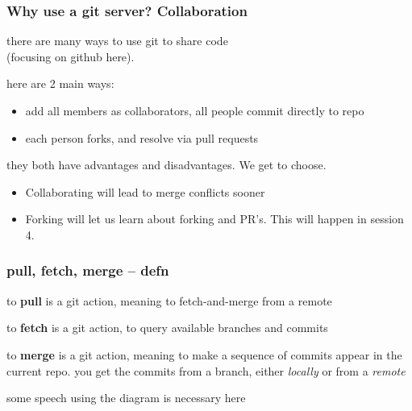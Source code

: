 \documentclass[14pt,aspectratio=1610]{beamer} %
\newcommand{\fframe}[2]{
   \begin{frame}
\frametitle{#1}
#2
\end{frame}
}
\begin{document}
\fframe{Why use a git server? Collaboration}
{

	there are many ways to use git to share code \\(focusing on github here).  


	\vspace{\baselineskip}
	here are 2 main ways:

\vspace{\baselineskip}
	\begin{itemize}
	\item add all members as collaborators, all people commit directly to repo
	\item each person forks, and resolve via pull requests
\end{itemize}

\vspace{\baselineskip}

they both have advantages and disadvantages.  We get to choose.  
	\begin{itemize}
	\item Collaborating will lead to merge conflicts sooner
	\item Forking will let us learn about forking and PR's.  This will happen in session 4.
\end{itemize}
}





\fframe{pull, fetch, merge -- defn}
{
\begin{definition}
to {\bf pull} is a git action, meaning to fetch-and-merge from a remote
	\end{definition}

	\begin{definition}
to {\bf fetch} is a git action, to query available branches and commits
	\end{definition}

\begin{definition}
to {\bf merge} is a git action, meaning to make a sequence of commits appear in the current repo.  you get the commits from a branch, either {\em locally} or from a {\em remote}
	\end{definition}

	some speech using the diagram is necessary here
}
\end{document}
